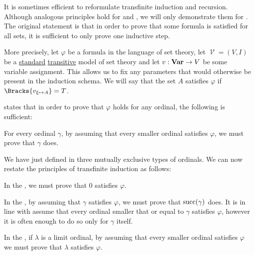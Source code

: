 \begin{remark}\label{rem:transfinite_induction}
  It is sometimes efficient to reformulate transfinite induction and recursion. Although analogous principles hold for  and , we will only demonstrate them for . The original statement is that in order to prove that some formula is satisfied for all sets, it is sufficient to only prove one inductive step.

  More precisely, let \( \varphi \) be a formula in the language of set theory, let \( \mscrV = (V, I) \) be a \hyperref[rem:standard_model_of_set_theory]{standard} \hyperref[rem:transitive_model_of_set_theory]{transitive} model of set theory and let \( v: \operatorname{\mathbf{Var}} \to V \) be some variable assignment. This allows us to fix any parameters that would otherwise be present in the induction schema. We will say that the set \( A \) satisfies \( \varphi \) if \( \Bracks{v_{\xi \mapsto A}} = T \).

   states that in order to prove that \( \varphi \) holds for any ordinal, the following is sufficient:
  \begin{thmenum}[series=rem:transfinite_induction]
     For every ordinal \( \gamma \), by assuming that every smaller ordinal satisfies \( \varphi \), we must prove that \( \gamma \) does.
  \end{thmenum}

  We have just defined in  three mutually exclusive types of ordinals. We can now restate the principles of transfinite induction as follows:
  \begin{thmenum}[resume=rem:transfinite_induction]
     In the , we must prove that \( 0 \) satisfies \( \varphi \).

     In the , by assuming that \( \gamma \) satisfies \( \varphi \), we must prove that \( \operatorname{succ}(\gamma) \) does. It is in line with  assume that every ordinal smaller that or equal to \( \gamma \) satisfies \( \varphi \), however it is often enough to do so only for \( \gamma \) itself.

     In the , if \( \lambda \) is a limit ordinal, by assuming that every smaller ordinal satisfies \( \varphi \) we must prove that \( \lambda \) satisfies \( \varphi \).
  \end{thmenum}


\end{remark}
